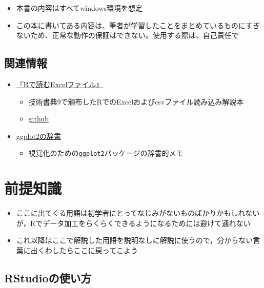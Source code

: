 \documentclass[
  xelatex,ja=standard, b5paper]{bxjsbook}
\providecommand{\tightlist}{%
  \setlength{\itemsep}{0pt}\setlength{\parskip}{0pt}}
\begin{document}
\begin{itemize}
\tightlist
\item
  本書の内容はすべてwindows環境を想定
\item
  この本に書いてある内容は、筆者が学習したことをまとめているものにすぎないため、正常な動作の保証はできない。使用する際は、自己責任で
\end{itemize}

\hypertarget{association}{%
\section*{関連情報}\label{association}}

\begin{itemize}
\tightlist
\item
  \href{https://techbookfest.org/product/4794168259903488?productVariantID=5913872206659584}{『Rで読むExcelファイル』}

  \begin{itemize}
  \tightlist
  \item
    技術書典9で頒布したRでのExcelおよびcsvファイル読み込み解説本
  \item
    \href{https://izunyan.github.io/excel_r/}{github}
  \end{itemize}
\item
  \href{https://izunyan.github.io/practice_ggplot2/}{ggplot2の辞書}

  \begin{itemize}
  \tightlist
  \item
    視覚化のための\texttt{ggplot2}パッケージの辞書的メモ
  \end{itemize}
\end{itemize}

\hypertarget{premise}{%
\chapter{前提知識}\label{premise}}

\begin{itemize}
\tightlist
\item
  ここに出てくる用語は初学者にとってなじみがないものばかりかもしれないが，Rでデータ加工をらくらくできるようになるためには避けて通れない
\item
  これ以降はここで解説した用語を説明なしに解説に使うので，分からない言葉に出くわしたらここに戻ってこよう
\end{itemize}

\hypertarget{p-howtouse-rst}{%
\section{RStudioの使い方}\label{p-howtouse-rst}}
\end{document}
